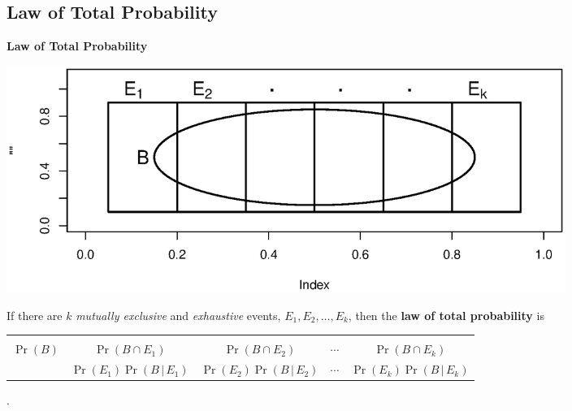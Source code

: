 \documentclass[compress]{beamer}        %
\makeatletter
\newcommand{\tcb}{\textcolor{beamer@blendedblue}}
\makeatother
\begin{document}
\subsection{Law of Total Probability}
\begin{frame}{\bf \tcb{Law of Total Probability}}

\begin{center}
\includegraphics[width=0.8\textwidth, trim = 3.3cm 3cm 2.3cm 2.5cm, clip]{totalprob2}
\end{center}

If there are $k$ \emph{mutually exclusive} and \emph{exhaustive} events, $E_1,E_2,\ldots,E_k$, then the {\bf law of total probability} is\\[-0.7cm]

\begin{adjustwidth}{-0.25cm}{0.1cm}
\begin{tabular}{|c@{\,\,$=$\,\,}c@{\,\,$+$\,\,}c@{\,\,$+$\,\,}c@{\,$+$\,\,}c|}
\hline
\multicolumn{5}{|c|}{}\\[-0.4cm]
$\Pr(B)$ & $\Pr(B \cap E_1)$ & $\Pr(B \cap E_2)$ & $\cdots$ & $\Pr(B \cap E_k)$ \\[0.2cm]
         & $\Pr(E_1) \Pr(B \,|\, E_1)$ & $\Pr(E_2) \Pr(B \,|\, E_2)$ & $\cdots$ & $\Pr(E_k) \Pr(B \,|\, E_k)$\\[0.1cm]
\hline
\end{tabular}.
\end{adjustwidth}

\end{frame}
\end{document}
